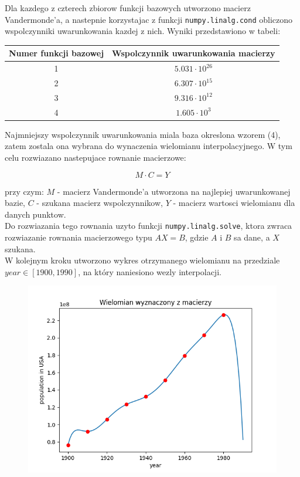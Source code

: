 \documentclass{article}
\begin{document}
	Dla kazdego z czterech zbiorow funkcji bazowych utworzono macierz Vandermonde'a, a nastepnie korzystajac z funkcji \texttt{numpy.linalg.cond} obliczono wspolczynniki uwarunkowania kazdej z nich. Wyniki przedstawiono w tabeli: 
	
	\begin{center}
		\caption{Wspolczynniki uwarunkowania macierzy}
		\begin{tabular}{|c|c|}
  			\hline 
  			Numer funkcji bazowej & Wspolczynnik uwarunkowania macierzy\\
  			\hline
  			1 & $5.031 \cdot 10^{26}$ \\
  			2 & $6.307 \cdot 10^{15}$ \\
  			3 & $9.316 \cdot 10^{12}$ \\
  			4 & $1.605 \cdot 10^{3}$ \\
  			\hline
		\end{tabular} 
		
	\end{center}
	
	Najmniejszy wspolczynnik uwarunkowania miala baza okreslona wzorem (4), zatem zostala ona wybrana do wynaczenia wielomianu interpolacyjnego. W tym celu rozwiazano nastepujace rownanie macierzowe:
	
	\begin{equation}
		M \cdot C = Y
	\end{equation}
	
	przy czym: $M$ - macierz Vandermonde'a utworzona na najlepiej uwarunkowanej bazie, $C$ - szukana macierz wspolczynnikow, $Y$ - macierz wartosci wielomianu dla danych punktow. \\
	Do rozwiazania tego rownania uzyto funkcji \texttt{numpy.linalg.solve}, ktora zwraca rozwiazanie rownania macierzowego typu $AX=B$, gdzie $A$ i $B$ sa dane, a $X$ szukana. \\
	W kolejnym kroku utworzono wykres otrzymanego wielomianu na przedziale $year \in [1900, 1990]$, na który naniesiono wezly interpolacji.
	
	
	\begin{figure}[h]
    		\centering
  		\includegraphics[scale = 0.9]{wykres1.png}
	\end{figure}
	
\end{document}
